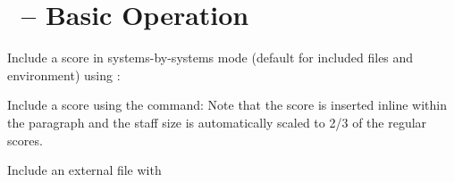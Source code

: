 \documentclass{scrartcl}
\begin{document}
\section*{\lyluatex\ -- Basic Operation}

Include a score in systems-by-systems mode (default for included files and
environment) using :



\bigskip
Include a score using the  command:%
Note that the score is inserted inline within the paragraph and the staff size
is automatically scaled to 2/3 of the regular scores.

\bigskip
Include an external file with 

\bigskip
{}
\end{document}
